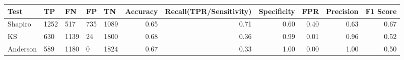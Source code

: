 \begin{tabular}{lllllrrrrrr}
\toprule
Test & TP & FN & FP & TN & Accuracy & Recall(TPR/Sensitivity) & Specificity & FPR & Precision & F1 Score \\
\midrule
Shapiro & 1252 & 517 & 735 & 1089 & 0.65 & 0.71 & 0.60 & 0.40 & 0.63 & 0.67 \\
KS & 630 & 1139 & 24 & 1800 & 0.68 & 0.36 & 0.99 & 0.01 & 0.96 & 0.52 \\
Anderson & 589 & 1180 & 0 & 1824 & 0.67 & 0.33 & 1.00 & 0.00 & 1.00 & 0.50 \\
\bottomrule
\end{tabular}
